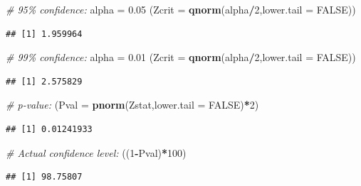 \documentclass[
]{book}
\newenvironment{Shaded}{\begin{snugshade}}{\end{snugshade}}
\newcommand{\AttributeTok}[1]{\textcolor[rgb]{0.13,0.29,0.53}{#1}}
\newcommand{\CommentTok}[1]{\textcolor[rgb]{0.56,0.35,0.01}{\textit{#1}}}
\newcommand{\ConstantTok}[1]{\textcolor[rgb]{0.56,0.35,0.01}{#1}}
\newcommand{\DecValTok}[1]{\textcolor[rgb]{0.00,0.00,0.81}{#1}}
\newcommand{\FloatTok}[1]{\textcolor[rgb]{0.00,0.00,0.81}{#1}}
\newcommand{\FunctionTok}[1]{\textcolor[rgb]{0.13,0.29,0.53}{\textbf{#1}}}
\newcommand{\NormalTok}[1]{#1}
\newcommand{\OtherTok}[1]{\textcolor[rgb]{0.56,0.35,0.01}{#1}}
\newcommand{\SpecialCharTok}[1]{\textcolor[rgb]{0.81,0.36,0.00}{\textbf{#1}}}
\begin{document}
\begin{Shaded}
\begin{Highlighting}[]
\CommentTok{\# 95\% confidence:}
\NormalTok{alpha }\OtherTok{=} \FloatTok{0.05}
\NormalTok{(}\AttributeTok{Zcrit =} \FunctionTok{qnorm}\NormalTok{(alpha}\SpecialCharTok{/}\DecValTok{2}\NormalTok{,}\AttributeTok{lower.tail =} \ConstantTok{FALSE}\NormalTok{))}
\end{Highlighting}
\end{Shaded}

\begin{verbatim}
## [1] 1.959964
\end{verbatim}

\begin{Shaded}
\begin{Highlighting}[]
\CommentTok{\# 99\% confidence:}
\NormalTok{alpha }\OtherTok{=} \FloatTok{0.01}
\NormalTok{(}\AttributeTok{Zcrit =} \FunctionTok{qnorm}\NormalTok{(alpha}\SpecialCharTok{/}\DecValTok{2}\NormalTok{,}\AttributeTok{lower.tail =} \ConstantTok{FALSE}\NormalTok{))}
\end{Highlighting}
\end{Shaded}

\begin{verbatim}
## [1] 2.575829
\end{verbatim}

\begin{Shaded}
\begin{Highlighting}[]
\CommentTok{\# p{-}value:}
\NormalTok{(}\AttributeTok{Pval =} \FunctionTok{pnorm}\NormalTok{(Zstat,}\AttributeTok{lower.tail =} \ConstantTok{FALSE}\NormalTok{)}\SpecialCharTok{*}\DecValTok{2}\NormalTok{)}
\end{Highlighting}
\end{Shaded}

\begin{verbatim}
## [1] 0.01241933
\end{verbatim}

\begin{Shaded}
\begin{Highlighting}[]
\CommentTok{\# Actual confidence level:}
\NormalTok{((}\DecValTok{1}\SpecialCharTok{{-}}\NormalTok{Pval)}\SpecialCharTok{*}\DecValTok{100}\NormalTok{)}
\end{Highlighting}
\end{Shaded}

\begin{verbatim}
## [1] 98.75807
\end{verbatim}
\end{document}
